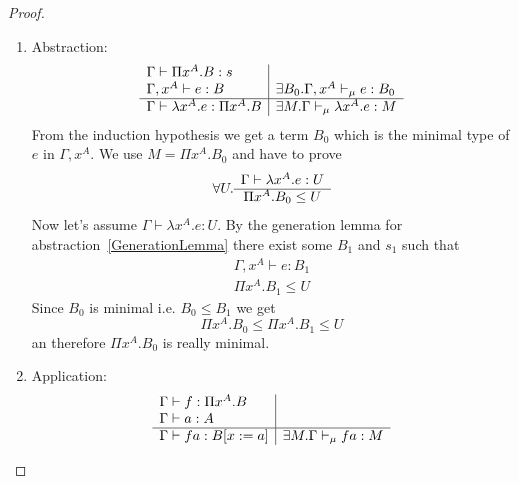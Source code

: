 \begin{theorem}
\begin{proof}
\begin{enumerate}
\begin{enumerate}
                \item Abstraction:
                    $$
                    \begin{array}{l|l}
                        \Gamma \vdash \Pi x^A. B : s
                        \\
                        \Gamma, x^A \vdash e: B
                        &
                        \exists B_0. \Gamma, x^A \vdash_\mu e: B_0
                        \\
                        \hline
                        \Gamma \vdash \lambda x^A. e: \Pi x^A. B
                        &
                        \exists M. \Gamma \vdash_\mu \lambda x^A.e: M
                    \end{array}
                    $$
                    From the induction hypothesis we get a term $B_0$ which is
                    the minimal type of $e$ in $\Gamma,x^A$. We use $M = \Pi
                    x^A. B_0$ and have to prove
                    $$
                    \forall U.
                    \begin{array}{c} \Gamma \vdash \lambda x^A. e: U \\ \hline \Pi x^A.B_0 \le U\end{array}
                    $$
                    Now let's assume $\Gamma \vdash \lambda x^A.e : U$. By the
                    generation lemma for abstraction~\ref{GenerationLemma} there
                    exist some $B_1$ and $s_1$ such that
                    $$
                    \begin{array}{l}
                        \Gamma, x^A \vdash e: B_1
                        \\
                        \Pi x^A. B_1 \le U
                    \end{array}
                    $$
                    Since $B_0$ is minimal i.e. $B_0 \le B_1$ we get
                    $$
                    \Pi x^A. B_0 \le \Pi x^A. B_1 \le U
                    $$
                    an therefore $\Pi x^A. B_0$ is really minimal.

                \item Application:
                    $$
                    \begin{array}{l|l}
                        \Gamma \vdash f: \Pi x^A.B
                        \\
                        \Gamma \vdash a: A
                        \\
                        \hline
                        \Gamma \vdash f a: B[x:=a]
                        &
                        \exists M. \Gamma \vdash_\mu f a: M
                    \end{array}
                    $$


\end{enumerate}
\end{enumerate}
\end{proof}
\end{theorem}
